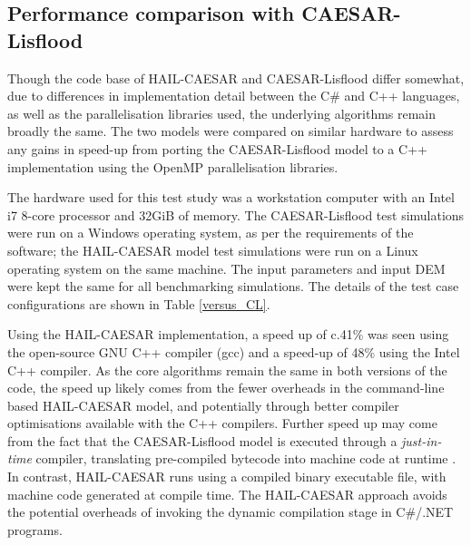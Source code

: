 \subsection{Performance comparison with CAESAR-Lisflood}

Though the code base of HAIL-CAESAR and CAESAR-Lisflood differ somewhat, due to differences in implementation detail between the C\# and C++ languages, as well as the parallelisation libraries used, the underlying algorithms remain broadly the same. The two models were compared on similar hardware to assess any gains in speed-up from porting the CAESAR-Lisflood model to a C++ implementation using the OpenMP parallelisation libraries.

The hardware used for this test study was a workstation computer with an Intel i7 8-core processor and 32GiB of memory. The CAESAR-Lisflood test simulations were run on a Windows operating system, as per the requirements of the software; the HAIL-CAESAR model test simulations were run on a Linux operating system on the same machine. The input parameters and input DEM were kept the same for all benchmarking simulations. The details of the test case configurations are shown in Table \ref{versus_CL}.

Using the HAIL-CAESAR implementation, a speed up of c.41\% was seen using the open-source GNU C++ compiler (gcc) and a speed-up of 48\% using the Intel C++ compiler. As the core algorithms remain the same in both versions of the code, the speed up likely comes from the fewer overheads in the command-line based HAIL-CAESAR model, and potentially through better compiler optimisations available with the C++ compilers. Further speed up may come from the fact that the CAESAR-Lisflood model is executed through a \textit{just-in-time} compiler, translating pre-compiled bytecode into machine code at runtime \citep{aycock2003brief}. In contrast, HAIL-CAESAR runs using a compiled binary executable file, with machine code generated at compile time. The HAIL-CAESAR approach avoids the potential overheads of invoking the dynamic compilation stage in C\#/.NET programs.

